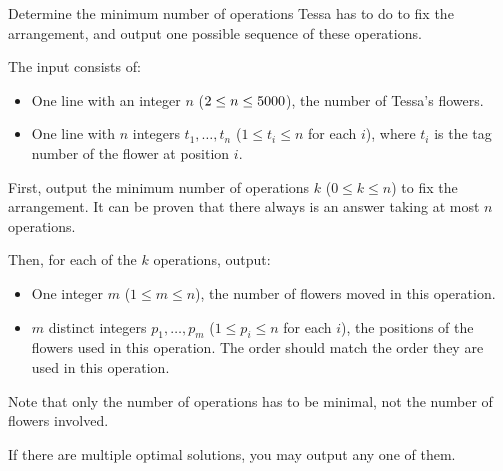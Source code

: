 Determine the minimum number of operations Tessa has to do to fix the arrangement, and output one possible sequence of these operations.

\newpage

\begin{Input}
    The input consists of:
    \begin{itemize}
        \item One line with an integer $n$ ($2 \leq n \leq 5000$), the number of Tessa's flowers.
        \item One line with $n$ integers $t_1, \ldots, t_n$ ($1 \leq t_i \leq n$ for each $i$), where $t_i$ is the tag number of the flower at position $i$.
    \end{itemize}
\end{Input}

\begin{Output}
    First, output the minimum number of operations $k$ ($0 \leq k \leq n$) to fix the arrangement. It can be proven that there always is an answer taking at most $n$ operations.

    Then, for each of the $k$ operations, output:
    \begin{itemize}
      \item One integer $m$ ($1 \leq m \leq n$), the number of flowers moved in this operation.
      \item $m$ distinct integers $p_1, \ldots, p_m$ ($1 \leq p_i \leq n$ for each $i$), the positions of the flowers used in this operation. The order should match the order they are used in this operation.
    \end{itemize}

    Note that only the number of operations has to be minimal, not the number of flowers involved.

    If there are multiple optimal solutions, you may output any one of them.
\end{Output}
